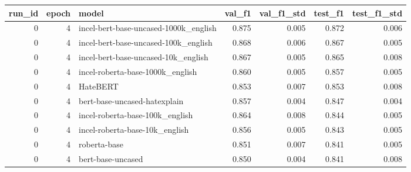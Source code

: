\begin{tabular}{rrlrrrr}
\toprule
 run\_id &  epoch &                                 model &  val\_f1 &  val\_f1\_std &  test\_f1 &  test\_f1\_std \\
\midrule
      0 &      4 & incel-bert-base-uncased-1000k\_english &   0.875 &       0.005 &    0.872 &        0.006 \\
      0 &      4 &  incel-bert-base-uncased-100k\_english &   0.868 &       0.006 &    0.867 &        0.005 \\
      0 &      4 &   incel-bert-base-uncased-10k\_english &   0.867 &       0.005 &    0.865 &        0.008 \\
      0 &      4 &      incel-roberta-base-1000k\_english &   0.860 &       0.005 &    0.857 &        0.005 \\
      0 &      4 &                              HateBERT &   0.853 &       0.007 &    0.853 &        0.008 \\
      0 &      4 &          bert-base-uncased-hatexplain &   0.857 &       0.004 &    0.847 &        0.004 \\
      0 &      4 &       incel-roberta-base-100k\_english &   0.864 &       0.008 &    0.844 &        0.005 \\
      0 &      4 &        incel-roberta-base-10k\_english &   0.856 &       0.005 &    0.843 &        0.005 \\
      0 &      4 &                          roberta-base &   0.851 &       0.007 &    0.841 &        0.005 \\
      0 &      4 &                     bert-base-uncased &   0.850 &       0.004 &    0.841 &        0.008 \\
\bottomrule
\end{tabular}
